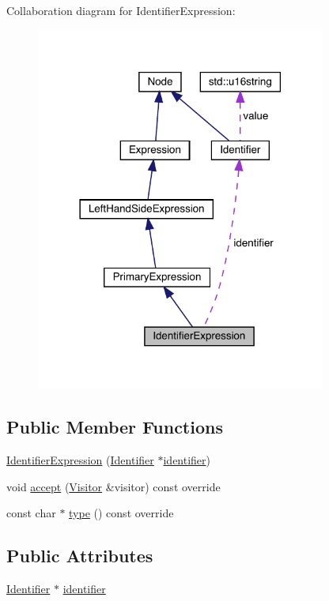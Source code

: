 Collaboration diagram for Identifier\+Expression\+:
\nopagebreak
\begin{figure}[H]
\begin{center}
\leavevmode
\includegraphics[width=270pt]{struct_identifier_expression__coll__graph}
\end{center}
\end{figure}
\subsection*{Public Member Functions}
\begin{DoxyCompactItemize}
\item 
\hyperlink{struct_identifier_expression_a187a16250972ed7afdd1cfc1972cffa8}{Identifier\+Expression} (\hyperlink{struct_identifier}{Identifier} $\ast$\hyperlink{struct_identifier_expression_ae22855c1fc8a900db6cce6e74db3f6cc}{identifier})
\item 
void \hyperlink{struct_identifier_expression_a95666fc6c9f12f7beec4db0131beadf8}{accept} (\hyperlink{struct_visitor}{Visitor} \&visitor) const override
\item 
const char $\ast$ \hyperlink{struct_identifier_expression_ab864c277df4f446b14cdc06e2fa5f7ad}{type} () const override
\end{DoxyCompactItemize}
\subsection*{Public Attributes}
\begin{DoxyCompactItemize}
\item 
\hyperlink{struct_identifier}{Identifier} $\ast$ \hyperlink{struct_identifier_expression_ae22855c1fc8a900db6cce6e74db3f6cc}{identifier}
\end{DoxyCompactItemize}


